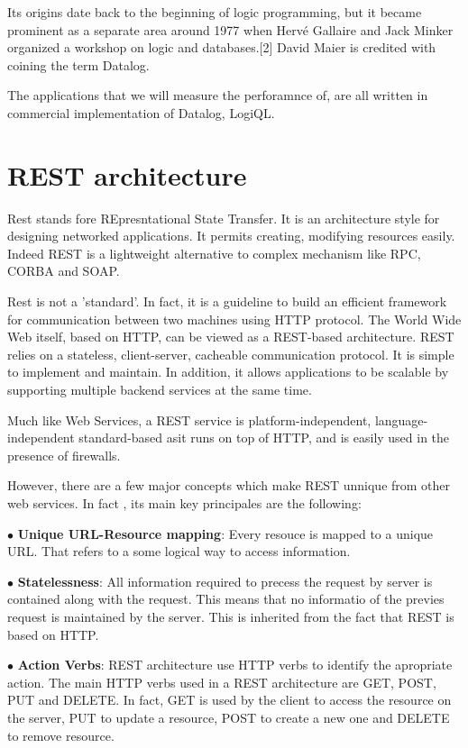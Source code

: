 Its origins date back to the beginning of logic programming, but it became
prominent as a separate area around 1977 when Hervé Gallaire and Jack Minker
organized a workshop on logic and databases.[2] David Maier is credited with
coining the term Datalog.

The applications that we will measure the perforamnce of, are all written in
commercial implementation of Datalog, LogiQL.

\section{REST architecture}
Rest stands fore REpresntational State Transfer. It is an architecture style for
designing networked applications. It permits creating, modifying resources
easily. Indeed REST is a lightweight alternative to complex mechanism like RPC,
CORBA and SOAP. 

Rest is not a 'standard'. In fact,  it is a guideline to build an efficient
framework for communication between two machines using HTTP protocol. The World
Wide Web itself, based on HTTP, can be viewed as a REST-based architecture. REST
relies on a stateless, client-server, cacheable communication protocol. It is
simple to implement and maintain. In addition, it allows applications to be scalable
by supporting multiple backend services at the same time.

Much like Web Services, a REST service is platform-independent,
language-independent standard-based asit runs on top of HTTP, and is easily used
in the presence of firewalls.

However, there are a few major concepts which make REST unnique from other web
services. In fact , its main key principales are the following:

$\bullet$ \textbf{Unique URL-Resource mapping}: Every resouce is mapped to a unique URL. That
refers to a some logical way  to access information. 

$\bullet$ \textbf{Statelessness}: All information required to precess the request by server is
contained along with the request. This means that no informatio of the previes
request is maintained by the server. This is inherited from the fact that REST
is based on HTTP.

$\bullet$ \textbf{Action Verbs}: REST architecture use HTTP verbs to identify the apropriate
action. The main HTTP verbs used in a REST architecture are GET, POST, PUT and
DELETE. In fact, GET is used by the client to access the resource on the server,
PUT to update a resource, POST to create a new one and DELETE to remove
resource.

